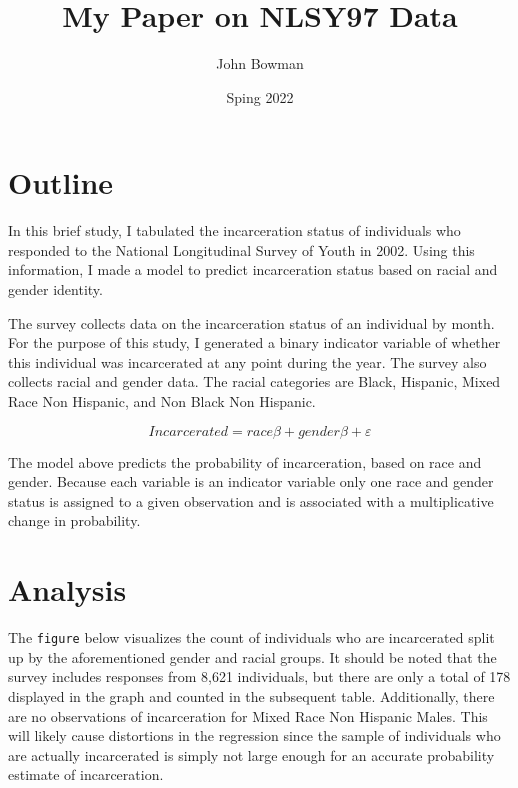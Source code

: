 \documentclass{article}
\author{John Bowman}
\title{My Paper on NLSY97 Data}
\date{Sping 2022}
\begin{document}
\maketitle

\section{Outline}

In this brief study, I tabulated the incarceration status of individuals who responded to the National Longitudinal Survey of Youth in 2002. Using this information, I made a model to predict incarceration status based on racial and gender identity.

The survey collects data on the incarceration status of an individual by month. For the purpose of this study, I generated a  binary indicator variable of whether this individual was incarcerated at any point during the year. The survey also collects racial and gender data. The racial categories are Black, Hispanic, Mixed Race Non Hispanic, and Non Black Non Hispanic.


$$
    Incarcerated = race\beta + gender\beta + \varepsilon
$$

The model above predicts the probability of incarceration, based on race and gender. Because each variable is an indicator variable only one race and gender status is assigned to a given observation and is associated with a multiplicative change in probability.

\newpage

\section{Analysis}

The \texttt{figure} below visualizes the count of individuals who are incarcerated split up by the aforementioned gender and racial groups. It should be noted that the survey includes responses from 8,621 individuals, but there are only a total of 178 displayed in the graph and counted in the subsequent table. Additionally, there are no observations of incarceration for Mixed Race Non Hispanic Males. This will likely cause distortions in the regression since the sample of individuals who are actually incarcerated is simply not large enough for an accurate probability estimate of incarceration. 
\end{document}
